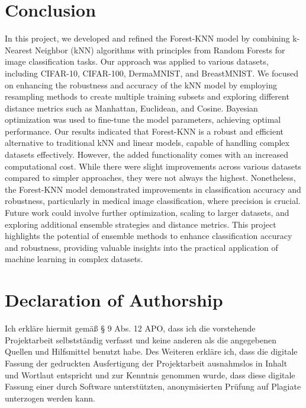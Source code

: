 \documentclass[a4paper]{article}
\begin{document}
\section{Conclusion}
In this project, we developed and refined the Forest-KNN model by combining k-Nearest Neighbor (kNN) algorithms with principles from Random Forests for image classification tasks. Our approach was applied to various datasets, including CIFAR-10, CIFAR-100, DermaMNIST, and BreastMNIST. We focused on enhancing the robustness and accuracy of the kNN model by employing resampling methods to create multiple training subsets and exploring different distance metrics such as Manhattan, Euclidean, and Cosine. Bayesian optimization was used to fine-tune the model parameters, achieving optimal performance. Our results indicated that Forest-KNN is a robust and efficient alternative to traditional kNN and linear models, capable of handling complex datasets effectively. However, the added functionality comes with an increased computational cost. While there were slight improvements across various datasets compared to simpler approaches, they were not always the highest. Nonetheless, the Forest-KNN model demonstrated improvements in classification accuracy and robustness, particularly in medical image classification, where precision is crucial. Future work could involve further optimization, scaling to larger datasets, and exploring additional ensemble strategies and distance metrics. This project highlights the potential of ensemble methods to enhance classification accuracy and robustness, providing valuable insights into the practical application of machine learning in complex datasets.






\newpage
{\parindent 0cm}
\section*{Declaration of Authorship}
Ich erkläre hiermit gemäß § 9 Abs. 12 APO, dass ich die vorstehende Projektarbeit selbstständig verfasst und keine anderen als die angegebenen Quellen und Hilfsmittel benutzt habe. Des Weiteren erkläre ich, dass die digitale Fassung der gedruckten Ausfertigung der Projektarbeit ausnahmslos in Inhalt und Wortlaut entspricht und zur Kenntnis genommen wurde, dass diese digitale Fassung einer durch Software unterstützten, anonymisierten Prüfung auf Plagiate unterzogen werden kann.\\
\vspace{2\baselineskip}
  
\end{document}
